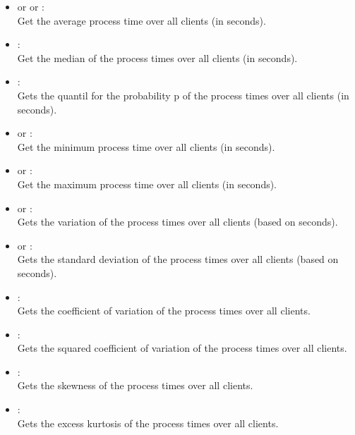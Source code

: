 \begin{itemize}

\item
{} or  or :\\
Get the average process time over all clients (in seconds).

\item
{}:\\
Get the median of the process times over all clients (in seconds).

\item
{}:\\
Gets the quantil for the probability p of the process times over all clients (in seconds).

\item
{} or :\\
Get the minimum process time over all clients (in seconds).

\item
{} or :\\
Get the maximum process time over all clients (in seconds).

\item
{} or :\\
Gets the variation of the process times over all clients (based on seconds).

\item
{} or :\\
Gets the standard deviation of the process times over all clients (based on seconds).

\item
{}:\\
Gets the coefficient of variation of the process times over all clients.

\item
{}:\\
Gets the squared coefficient of variation of the process times over all clients.

\item
{}:\\
Gets the skewness of the process times over all clients.

\item
{}:\\
Gets the excess kurtosis of the process times over all clients.


\end{itemize}
